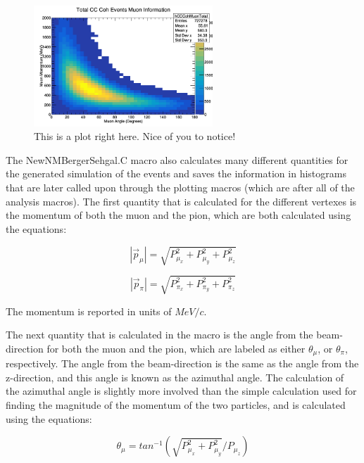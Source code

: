 \documentclass[11pt]{article}
\begin{document}
\begin{figure}[H]
\centering
\includegraphics[width=0.6\textwidth]{NewNMBergerSehgalImages/9-TotalCCCohMuonInfoNMBS.png}
\caption{This is a plot right here. Nice of you to notice!}
\end{figure}

The NewNMBergerSehgal.C macro also calculates many different quantities for the generated simulation of the events and saves the information in histograms that are later called upon through the plotting macros (which are after all of the analysis macros). The first quantity that is calculated for the different vertexes is the momentum of both the muon and the pion, which are both calculated using the equations:

\begin{equation}
|\vec{p}_\mu| = \sqrt{P_{\mu_x}^2 + P_{\mu_y}^2 + P_{\mu_z}^2}
\end{equation}

\begin{equation}
|\vec{p}_\pi| = \sqrt{P_{\pi_x}^2 + P_{\pi_y}^2 + P_{\pi_z}^2}
\end{equation}

\noindent
The momentum is reported in units of $MeV/c$.

The next quantity that is calculated in the macro is the angle from the beam-direction for both the muon and the pion, which are labeled as either $\theta_\mu$, or $\theta_\pi$, respectively. The angle from the beam-direction is the same as the angle from the z-direction, and this angle is known as the azimuthal angle. The calculation of the azimuthal angle is slightly more involved than the simple calculation used for finding the magnitude of the momentum of the two particles, and is calculated using the equations:

\begin{equation}
\theta_\mu = tan^{-1}(\sqrt{P_{\mu_x}^2 + P_{\mu_y}^2}/{P_{\mu_z}})
\end{equation}
\end{document}
